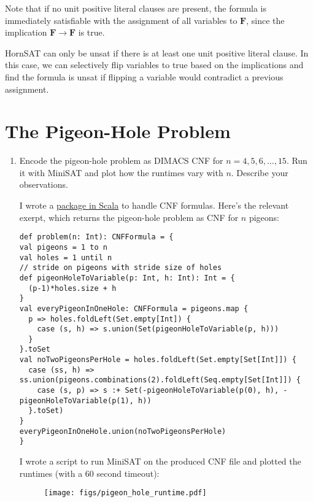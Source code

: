 \begin{enumerate}[label=(\alph*)]
    Note that if no unit positive literal clauses are present, the formula is immediately satisfiable with the assignment of all variables to $\mathbf{F}$, since the implication $\mathbf{F} \rightarrow \mathbf{F}$ is true.

    HornSAT can only be unsat if there is at least one unit positive literal clause. In this case, we can selectively flip variables to true based on the implications and find the formula is unsat if flipping a variable would contradict a previous assignment.
\end{enumerate}

\section{The Pigeon-Hole Problem}
\begin{enumerate}[label=(\alph*)]
    \item {\color{blue} Encode the pigeon-hole problem as DIMACS CNF for $n = 4, 5, 6, \dots, 15$. Run it with MiniSAT and plot how the runtimes vary with $n$. Describe your observations.}

    I wrote a \href{https://github.com/vighneshiyer/ee219c-formal/blob/master/formal-toolkit/src/main/scala/formal/PigeonHoleProblem.scala}{package in Scala} to handle CNF formulas. Here's the relevant exerpt, which returns the pigeon-hole problem as CNF for $n$ pigeons:

        \begin{verbatim}
def problem(n: Int): CNFFormula = {
val pigeons = 1 to n
val holes = 1 until n
// stride on pigeons with stride size of holes
def pigeonHoleToVariable(p: Int, h: Int): Int = {
  (p-1)*holes.size + h
}
val everyPigeonInOneHole: CNFFormula = pigeons.map {
  p => holes.foldLeft(Set.empty[Int]) {
    case (s, h) => s.union(Set(pigeonHoleToVariable(p, h)))
  }
}.toSet
val noTwoPigeonsPerHole = holes.foldLeft(Set.empty[Set[Int]]) {
  case (ss, h) => ss.union(pigeons.combinations(2).foldLeft(Seq.empty[Set[Int]]) {
    case (s, p) => s :+ Set(-pigeonHoleToVariable(p(0), h), -pigeonHoleToVariable(p(1), h))
  }.toSet)
}
everyPigeonInOneHole.union(noTwoPigeonsPerHole)
}
        \end{verbatim}

        I wrote a script to run MiniSAT on the produced CNF file and plotted the runtimes (with a 60 second timeout):

        \begin{figure}[H]
          \centering
          \texttt{[image: figs/pigeon\_hole\_runtime.pdf]}
        \end{figure}


\end{enumerate}
